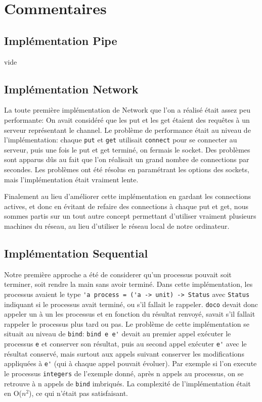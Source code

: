 \documentclass[a4paper]{article}
\begin{document}
\section{Commentaires}

\subsection{Implémentation Pipe}
vide
\subsection{Implémentation Network}
La toute première implémentation de Network que l'on a réalisé était assez
peu performante: On avait considéré que les put et les get étaient des
requêtes à un serveur représentant le channel. Le problème de performance
était au niveau de l'implémentation: chaque \verb!put! et \verb!get! utilisait
\verb!connect! pour se connecter au serveur, puis une fois le put et get
terminé, on fermais le socket. Des problèmes sont apparus dûs au fait que l'on réalisait
un grand nombre de connections par secondes. Les problèmes ont été résolus
en paramétrant les options des sockets,
mais l'implémentation était vraiment lente.

Finalement au lieu d'améliorer cette implémentation en gardant les
connections actives, et donc en évitant de refaire des connections à chaque
put et get, nous sommes partis sur un tout autre concept permettant
d'utiliser vraiment plusieurs machines du réseau, au lieu d'utiliser le
réseau local de notre ordinateur.
\subsection{Implémentation Sequential}
Notre première approche a été de considerer qu'un processus pouvait soit
terminer, soit rendre la main sans avoir terminé. Dans cette
implémentation, les processus avaient le type \verb!'a process = ('a -> unit) -> Status! avec \verb!Status! indiquant si le processus avait terminé, ou s'il fallait le rappeler. \verb!doco! devait donc appeler un à un les processus et en fonction du résultat renvoyé, savait s'il fallait rappeler le processus plus tard ou pas. 
Le problème de cette implémentation se situait au niveau de \verb!bind!:
\verb!bind e e'! devait au premier appel exécuter le processus \verb!e! et conserver son résultat, puis au second appel exécuter \verb!e'! avec le résultat conservé, mais surtout aux appels suivant conserver les modifications appliquées à \verb!e'! (qui à chaque appel pouvait évoluer). Par exemple si l'on execute le processus \verb!integers! de l'exemple donné, après n appels au processus, on se retrouve à n appels de \verb!bind! imbriqués. La complexité de l'implémentation était en O($n^2$), ce qui n'était pas satisfaisant.
\end{document}
